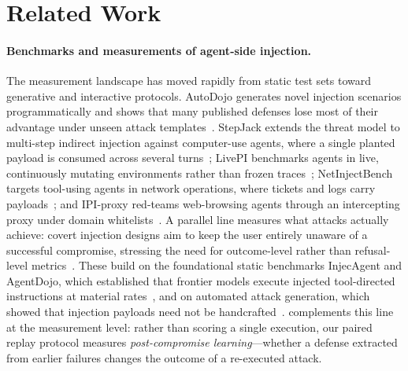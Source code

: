 \section{Related Work}
\label{sec:related}

\paragraph{Benchmarks and measurements of agent-side injection.}
The measurement landscape has moved rapidly from static test sets toward generative and interactive protocols. AutoDojo generates novel injection scenarios programmatically and shows that many published defenses lose most of their advantage under unseen attack templates~\cite{ma2026autodojo}. StepJack extends the threat model to multi-step indirect injection against computer-use agents, where a single planted payload is consumed across several turns~\cite{zhan2026stepjack}; LivePI benchmarks agents in live, continuously mutating environments rather than frozen traces~\cite{zhao2026livepi}; NetInjectBench targets tool-using agents in network operations, where tickets and logs carry payloads~\cite{shayoni2026netinjectbench}; and IPI-proxy red-teams web-browsing agents through an intercepting proxy under domain whitelists~\cite{chiapei2026ipiproxy}. A parallel line measures what attacks actually achieve: covert injection designs aim to keep the user entirely unaware of a successful compromise, stressing the need for outcome-level rather than refusal-level metrics~\cite{lee2026will}. These build on the foundational static benchmarks InjecAgent and AgentDojo, which established that frontier models execute injected tool-directed instructions at material rates~\cite{zhan2024injecagent,debenedetti2024agentdojo}, and on automated attack generation, which showed that injection payloads need not be handcrafted~\cite{liu2024automatic,wang2025webinject,shi2025prompt,wang2025agentvigil,yang2026when}. \method{} complements this line at the measurement level: rather than scoring a single execution, our paired replay protocol measures \emph{post-compromise learning}---whether a defense extracted from earlier failures changes the outcome of a re-executed attack.

